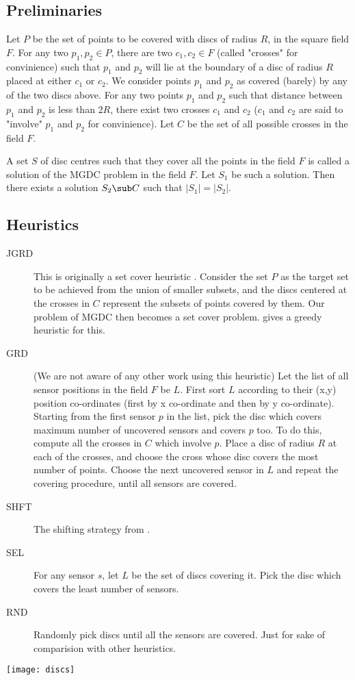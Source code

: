 \subsection{Preliminaries}

Let $P$ be the set of points to be covered with discs of radius $R$, in the square field $F$. For any two $p_1, p_2 \in P$, there are two $c_1,c_2 \in F$ (called "crosses" for convinience) such that $p_1$ and $p_2$ will lie at the boundary of a disc of radius $R$ placed at either $c_1$ or $c_2$. We consider points $p_1$ and $p_2$ as covered (barely) by any of the two discs above. For any two points $p_1$ and $p_2$ such that distance between $p_1$ and $p_2$ is less than $2R$, there exist two crosses $c_1$ and $c_2$ ($c_1$ and $c_2$ are said to "involve" $p_1$ and $p_2$ for convinience). Let $C$ be the set of all possible crosses in the field $F$.

A set $S$ of disc centres such that they cover all the points in the field $F$ is called a solution of the MGDC problem in the field $F$. Let $S_1$ be such a solution. Then there exists a solution $S_2 \sub C$ such that $|S_1|=|S_2|$.

\subsection{Heuristics}

\begin{description}

\item[JGRD] This is originally a set cover heuristic \cite{jgreedy}. Consider the set $P$ as the target set to be achieved from the union of smaller subsets, and the discs centered at the crosses in $C$ represent the subsets of points covered by them. Our problem of MGDC then becomes a set cover problem. \cite{jgreedy} gives a greedy heuristic for this.

\item[GRD] (We are not aware of any other work using this heuristic) Let the list of all sensor positions in the field $F$ be $L$. First sort $L$ according to their (x,y) position co-ordinates (first by x co-ordinate and then by y co-ordinate). Starting from the first sensor $p$ in the list, pick the disc which covers maximum number of uncovered sensors and covers $p$ too. To do this, compute all the crosses in $C$ which involve $p$. Place a disc of radius $R$ at each of the crosses, and choose the cross whose disc covers the most number of points. Choose the next uncovered sensor in $L$ and repeat the covering procedure, until all sensors are covered.

\item[SHFT] The shifting strategy from \cite{shifting}.
\item[SEL] For any sensor $s$, let $L$ be the set of discs covering it. Pick the disc which covers the least number of sensors.
\item[RND] Randomly pick discs until all the sensors are covered. Just for sake of comparision with other heuristics.
\end{description}

\texttt{[image: discs]}